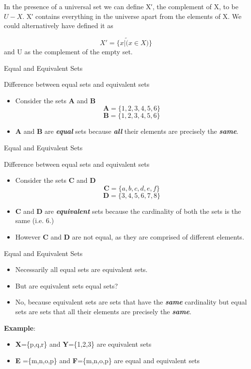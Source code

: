 In the presence of a universal set we can define X′, the complement of X, to be $U−X$. X′ contains everything in the universe apart from the elements of X. We could alternatively have defined it as

\[X′ = \{x | \tilde (x\in X)\}\]
and U as the complement of the empty set.

{Equal and Equivalent Sets}

Difference between equal sets and equivalent sets

\begin{itemize}
\item Consider the sets \textbf{A} and \textbf{B}
\[ \boldsymbol{A} = \{ 1,2,3,4,5,6 \} \] 
\[ \boldsymbol{B} = \{1,2,3,4,5,6 \} \]
\item \textbf{A} and \textbf{B} are \textit{\textbf{equal}} sets because \textit{\textbf{all}} their
elements are precisely the \textit{\textbf{same}}.
\end{itemize}





{Equal and Equivalent Sets}

Difference between equal sets and equivalent sets

\begin{itemize}
\item Consider the sets \textbf{C} and \textbf{D}
\[ \boldsymbol{C} = \{a,b,c,d,e,f\} \]  \[ \boldsymbol{D} = \{3,4,5,6,7,8\} \]
\item \textbf{C} and \textbf{D} are \textit{\textbf{equivalent}} sets
because the cardinality of both the sets is the same (i.e. 6.)
\item However \textbf{C} and \textbf{D} are not equal, as they are comprised of different elements.
\end{itemize}








{Equal and Equivalent Sets}


\begin{itemize}
\item Necessarily all equal sets are equivalent sets.
\item But are equivalent sets equal sets?

\item No, because equivalent sets are sets that have the \textit{\textbf{same}} cardinality but equal sets are sets that all
their elements are precisely the \textit{\textbf{same}}. 
\end{itemize}

\textbf{Example}:
\begin{itemize} \item \textbf{X}=\{p,q,r\} and \textbf{Y}=\{1,2,3\} are equivalent sets 
\item \textbf{E} =\{m,n,o,p\}
and \textbf{F}=\{m,n,o,p\} are equal and equivalent sets
\end{itemize}

